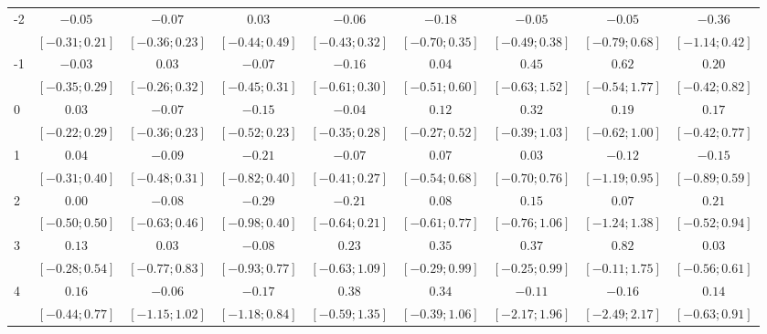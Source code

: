 \documentclass[12pt]{amsart}
\begin{document}
\begin{table}
\begin{adjustbox}{width=\textwidth}
\begin{tabular}{l c c c c | c c c c}
-2 & $-0.05$          & $-0.07$          & $0.03$           & $-0.06$          & $-0.18$          & $-0.05$          & $-0.05$          & $-0.36$          \\
   & $ [-0.31; 0.21]$ & $ [-0.36; 0.23]$ & $ [-0.44; 0.49]$ & $ [-0.43; 0.32]$ & $ [-0.70; 0.35]$ & $ [-0.49; 0.38]$ & $ [-0.79; 0.68]$ & $ [-1.14; 0.42]$ \\
-1 & $-0.03$          & $0.03$           & $-0.07$          & $-0.16$          & $0.04$           & $0.45$           & $0.62$           & $0.20$           \\
   & $ [-0.35; 0.29]$ & $ [-0.26; 0.32]$ & $ [-0.45; 0.31]$ & $ [-0.61; 0.30]$ & $ [-0.51; 0.60]$ & $ [-0.63; 1.52]$ & $ [-0.54; 1.77]$ & $ [-0.42; 0.82]$ \\
0  & $0.03$           & $-0.07$          & $-0.15$          & $-0.04$          & $0.12$           & $0.32$           & $0.19$           & $0.17$           \\
   & $ [-0.22; 0.29]$ & $ [-0.36; 0.23]$ & $ [-0.52; 0.23]$ & $ [-0.35; 0.28]$ & $ [-0.27; 0.52]$ & $ [-0.39; 1.03]$ & $ [-0.62; 1.00]$ & $ [-0.42; 0.77]$ \\
1  & $0.04$           & $-0.09$          & $-0.21$          & $-0.07$          & $0.07$           & $0.03$           & $-0.12$          & $-0.15$          \\
   & $ [-0.31; 0.40]$ & $ [-0.48; 0.31]$ & $ [-0.82; 0.40]$ & $ [-0.41; 0.27]$ & $ [-0.54; 0.68]$ & $ [-0.70; 0.76]$ & $ [-1.19; 0.95]$ & $ [-0.89; 0.59]$ \\
2  & $0.00$           & $-0.08$          & $-0.29$          & $-0.21$          & $0.08$           & $0.15$           & $0.07$           & $0.21$           \\
   & $ [-0.50; 0.50]$ & $ [-0.63; 0.46]$ & $ [-0.98; 0.40]$ & $ [-0.64; 0.21]$ & $ [-0.61; 0.77]$ & $ [-0.76; 1.06]$ & $ [-1.24; 1.38]$ & $ [-0.52; 0.94]$ \\
3  & $0.13$           & $0.03$           & $-0.08$          & $0.23$           & $0.35$           & $0.37$           & $0.82$           & $0.03$           \\
   & $ [-0.28; 0.54]$ & $ [-0.77; 0.83]$ & $ [-0.93; 0.77]$ & $ [-0.63; 1.09]$ & $ [-0.29; 0.99]$ & $ [-0.25; 0.99]$ & $ [-0.11; 1.75]$ & $ [-0.56; 0.61]$ \\
4  & $0.16$           & $-0.06$          & $-0.17$          & $0.38$           & $0.34$           & $-0.11$          & $-0.16$          & $0.14$           \\
   & $ [-0.44; 0.77]$ & $ [-1.15; 1.02]$ & $ [-1.18; 0.84]$ & $ [-0.59; 1.35]$ & $ [-0.39; 1.06]$ & $ [-2.17; 1.96]$ & $ [-2.49; 2.17]$ & $ [-0.63; 0.91]$ \\

\end{tabular}
\end{adjustbox}
\end{table}
\end{document}
